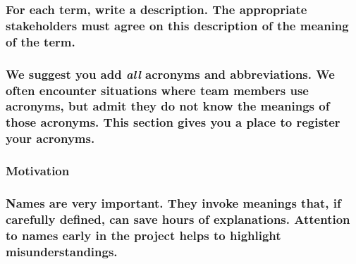 \documentclass[
]{article}
\begin{document}
\hypertarget{for-each-term-write-a-description.-the-appropriate-stakeholders-must-agree-on-this-description-of-the-meaning-of-the-term.}{%
\subsubsection{\texorpdfstring{For each term, write a description. The
appropriate stakeholders must agree on this description of the meaning
of the term.
}{For each term, write a description. The appropriate stakeholders must agree on this description of the meaning of the term. }}\label{for-each-term-write-a-description.-the-appropriate-stakeholders-must-agree-on-this-description-of-the-meaning-of-the-term.}}

\hypertarget{we-suggest-you-add-all-acronyms-and-abbreviations.-we-often-encounter-situations-where-team-members-use-acronyms-but-admit-they-do-not-know-the-meanings-of-those-acronyms.-this-section-gives-you-a-place-to-register-your-acronyms.}{%
\subsubsection{\texorpdfstring{We suggest you add \emph{all} acronyms
and abbreviations. We often encounter situations where team members use
acronyms, but admit they do not know the meanings of those acronyms.
This section gives you a place to register your acronyms.
}{We suggest you add all acronyms and abbreviations. We often encounter situations where team members use acronyms, but admit they do not know the meanings of those acronyms. This section gives you a place to register your acronyms. }}\label{we-suggest-you-add-all-acronyms-and-abbreviations.-we-often-encounter-situations-where-team-members-use-acronyms-but-admit-they-do-not-know-the-meanings-of-those-acronyms.-this-section-gives-you-a-place-to-register-your-acronyms.}}

\hypertarget{motivation-18}{%
\subsubsection{Motivation}\label{motivation-18}}

\hypertarget{names-are-very-important.-they-invoke-meanings-that-if-carefully-defined-can-save-hours-of-explanations.-attention-to-names-early-in-the-project-helps-to-highlight-misunderstandings.}{%
\subsubsection{\texorpdfstring{Names are very important. They invoke
meanings that, if carefully defined, can save hours of explanations.
Attention to names early in the project helps to highlight
misunderstandings.
}{Names are very important. They invoke meanings that, if carefully defined, can save hours of explanations. Attention to names early in the project helps to highlight misunderstandings. }}\label{names-are-very-important.-they-invoke-meanings-that-if-carefully-defined-can-save-hours-of-explanations.-attention-to-names-early-in-the-project-helps-to-highlight-misunderstandings.}}
\end{document}
